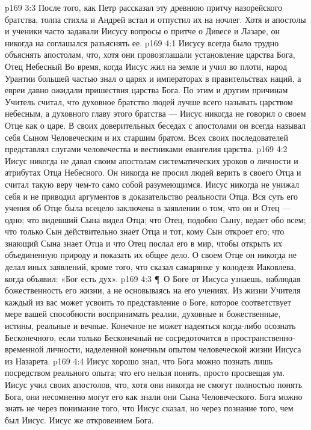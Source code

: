 \vs p169 3:3 После того, как Петр рассказал эту древнюю притчу назорейского братства, толпа стихла и Андрей встал и отпустил их на ночлег. Хотя и апостолы и ученики часто задавали Иисусу вопросы о притче о Дивесе и Лазаре, он никогда на соглашался разъяснять ее.
\vs p169 4:1 Иисусу всегда было трудно объяснять апостолам, что, хотя они провозглашали установление царства Бога, Отец Небесный  Во время, когда Иисус жил на земле и учил во плоти, народ Урантии большей частью знал о царях и императорах в правительствах наций, а евреи давно ожидали пришествия царства Бога. По этим и другим причинам Учитель считал, что духовное братство людей лучше всего называть царством небесным, а духовного главу этого братства ---  Иисус никогда не говорил о своем Отце как о царе. В своих доверительных беседах с апостолами он всегда называл себя Сыном Человеческим и их старшим братом. Всех своих последователей представлял слугами человечества и вестниками евангелия царства.
\vs p169 4:2 Иисус никогда не давал своим апостолам систематических уроков о личности и атрибутах Отца Небесного. Он никогда не просил людей верить в своего Отца и считал такую веру чем\hyp{}то само собой разумеющимся. Иисус никогда не унижал себя и не приводил аргументов в доказательство реальности Отца. Вся суть его учения об Отце была всецело заключена в заявлении о том, что он и Отец --- одно; что видевший Сына видел Отца; что Отец, подобно Сыну, ведает обо всем; что только Сын действительно знает Отца и тот, кому Сын откроет его; что знающий Сына знает Отца и что Отец послал его в мир, чтобы открыть их объединенную природу и показать их общее дело. О своем Отце он никогда не делал иных заявлений, кроме того, что сказал самарянке у колодезя Иаковлева, когда объявил: «Бог есть дух».
\vs p169 4:3 \P\ О Боге от Иисуса узнаешь, наблюдая божественность его жизни, а не основываясь на его учениях. Из жизни Учителя каждый из вас может усвоить то представление о Боге, которое соответствует мере вашей способности воспринимать реалии, духовные и божественные, истины, реальные и вечные. Конечное не может надеяться когда\hyp{}либо осознать Бесконечного, если только Бесконечный не сосредоточится в пространственно\hyp{}временной личности, наделенной конечным опытом человеческой жизни Иисуса из Назарета.
\vs p169 4:4 Иисус хорошо знал, что Бога можно познать лишь посредством реального опыта; что его нельзя понять, просто просвещая ум. Иисус учил своих апостолов, что, хотя они никогда не смогут полностью понять Бога, они несомненно могут его  как знали они Сына Человеческого. Бога можно знать не через понимание того, что Иисус сказал, но через познание того, чем был Иисус. Иисус же  откровением Бога.
